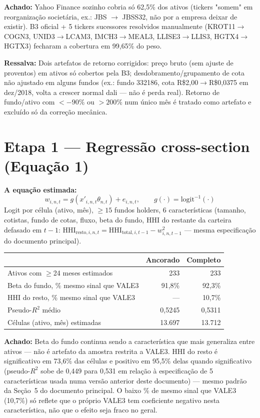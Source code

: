 \documentclass[11pt,a4paper]{article}
\newcommand{\equacao}[0]{\par\vspace{4pt}\noindent\textbf{\color{vermelho}A equação estimada:}\ }
\newcommand{\aha}[1]{\par\vspace{4pt}\noindent\textbf{\color{vermelho}Achado:} #1\par\vspace{2pt}}
\newcommand{\ressalva}[1]{\par\vspace{4pt}\noindent\textbf{\color{verde}Ressalva:} #1\par\vspace{2pt}}
\begin{document}
\aha{Yahoo Finance sozinho cobria só 62,5\% dos ativos (tickers "somem" em reorganização
societária, ex.: JBS $\to$ JBSS32, não por a empresa deixar de existir). B3 oficial + 5
tickers sucessores resolvidos manualmente (KROT11$\to$COGN3, UNID3$\to$LCAM3,
IMCH3$\to$MEAL3, LLISE3$\to$LLIS3, HGTX4$\to$HGTX3) fecharam a cobertura em 99,65\% do peso.}

\ressalva{Dois artefatos de retorno corrigidos: preço bruto (sem ajuste de proventos) em
ativos só cobertos pela B3; desdobramento/grupamento de cota não ajustado em alguns fundos
(ex.: fundo 332186, cota R\$2,00$\to$R\$0,0375 em dez/2018, volta a crescer normal dali ---
não é perda real). Retorno de fundo/ativo com $<-90\%$ ou $>200\%$ num único mês é tratado
como artefato e excluído só da correção mecânica.}

\section{Etapa 1 --- Regressão cross-section (Equação 1)}

\equacao
$$w_{i,n,t} = g(x'_{i,n,t}\theta_{n,t}) + e_{i,n,t}, \qquad
g(\cdot) = \text{logit}^{-1}(\cdot)$$
Logit por célula (ativo, mês), $\geq15$ fundos holders, 6 características (tamanho, cotistas,
fundo de cotas, fluxo, beta do fundo, HHI do restante da carteira defasado em $t-1$:
$\text{HHI}_{\text{resto},i,n,t} = \text{HHI}_{\text{total},i,t-1} - w_{i,n,t-1}^2$ --- mesma
especificação do documento principal).

\begin{center}\small
\begin{tabular}{lrr}
\toprule
 & \textbf{Ancorado} & \textbf{Completo} \\
\midrule
Ativos com $\geq$24 meses estimados & 233 & 233 \\
Beta do fundo, \% mesmo sinal que VALE3 & 91,8\% & 92,3\% \\
HHI do resto, \% mesmo sinal que VALE3 & --- & 10,7\% \\
Pseudo-$R^2$ médio & 0,5245 & 0,5311 \\
Células (ativo, mês) estimadas & 13.697 & 13.712 \\
\bottomrule
\end{tabular}
\end{center}

\aha{Beta do fundo continua sendo a característica que mais generaliza entre ativos --- não é
artefato da amostra restrita a VALE3. HHI do resto é significativo em 73,6\% das células e
positivo em 95,5\% delas quando significativo (pseudo-$R^2$ sobe de 0,449 para 0,531 em relação
à especificação de 5 características usada numa versão anterior deste documento) --- mesmo
padrão da Seção~5 do documento principal. O baixo \% de mesmo sinal que VALE3 (10,7\%) só
reflete que o próprio VALE3 tem coeficiente negativo nesta característica, não que o efeito seja
fraco no geral.}
\end{document}
